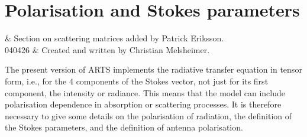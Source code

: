 \chapter{Polarisation and Stokes parameters}
 \label{sec:polarization}


 & Section on scattering matrices added by Patrick Eriksson. \\
  040426 & Created and written by Christian Melsheimer.\\
\stophistory


\graphicspath{{Figs/polarization/}}



\newcommand{\ColVct}[3]{\left( \begin{array}{c}
                                   #1 \\ #2 \\ #3
                               \end{array} \right) }
\newcommand{\PrtDrv}[2]{\frac{\partial #1}{\partial #2}}
\newcommand{\eVrt} {\ensuremath{\VctStl{e}_v}}
\newcommand{\eHor} {\ensuremath{\VctStl{e}_h}}
\newcommand{\eLh} {\ensuremath{\VctStl{e}_{LH}}}
\newcommand{\eRh} {\ensuremath{\VctStl{e}_{RH}}}
\newcommand{\ePls} {\ensuremath{\VctStl{e}_{+45\degree}}}
\newcommand{\eMin} {\ensuremath{\VctStl{e}_{-45\degree}}}
\newcommand{\mi}  {\ensuremath{\mathrm{i}}}


The present version of ARTS implements the radiative transfer equation in
tensor form, i.e., for the 4 components of the Stokes vector, not just for its
first component, the intensity or radiance. This means that the model can
include polarisation dependence in absorption or scattering processes. It is
therefore necessary to give some details on the polarisation of radiation, the
definition of the Stokes parameters, and the definition of antenna
polarisation.\\



